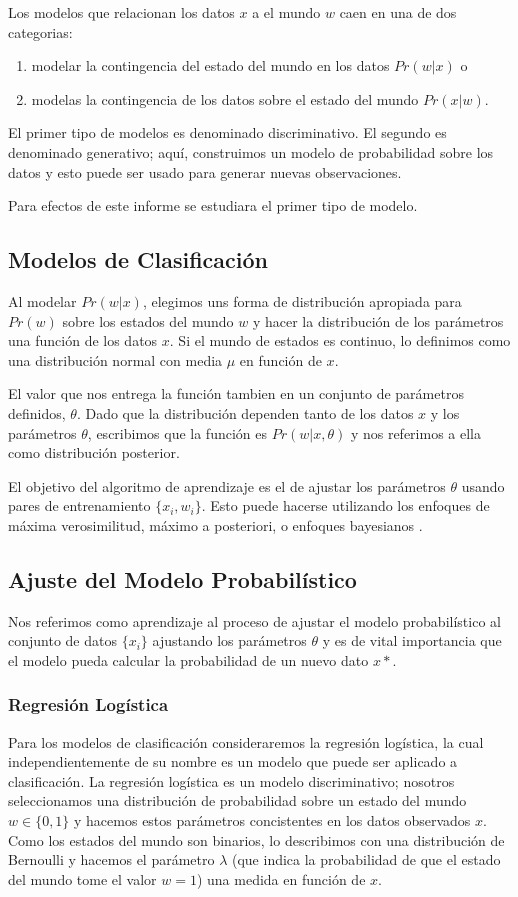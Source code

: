 \documentclass[letter,12pt]{report}
\begin{document}
Los modelos que relacionan los datos $x$ a el mundo $w$ caen en una de dos categorias:
\begin{enumerate}
    \item modelar la contingencia del estado del mundo en los datos $Pr(w|x)$ o
    \item modelas la contingencia de los datos sobre el estado del mundo $Pr(x|w)$.
\end{enumerate}

El primer tipo de modelos es denominado discriminativo. El segundo es denominado
generativo; aquí, construimos un modelo de probabilidad sobre los datos y esto puede ser
usado para generar nuevas observaciones.

Para efectos de este informe se estudiara el primer tipo de modelo.

\subsection{Modelos de Clasificación}
Al modelar $Pr(w|x)$, elegimos uns forma de distribución apropiada para $Pr(w)$ sobre los
estados del mundo $w$ y hacer la distribución de los parámetros una función de los datos
$x$. Si el mundo de estados es continuo, lo definimos como una distribución normal con
media $\mu$ en función de $x$\cite{MLClass}.

El valor que nos entrega la función tambien en un conjunto de parámetros definidos,
$\theta$. Dado que la distribución dependen tanto de los datos $x$ y los parámetros
$\theta$, escribimos que la función es $Pr(w|x, \theta)$ y nos referimos a ella como
distribución posterior.

El objetivo del algoritmo de aprendizaje es el de ajustar los parámetros $\theta$ usando
pares de entrenamiento $\{x_i, w_i\}$. Esto puede hacerse utilizando los enfoques de
máxima verosimilitud, máximo a posteriori, o enfoques bayesianos .%

\subsection{Ajuste del Modelo Probabilístico}
Nos referimos como aprendizaje al proceso de ajustar el modelo probabilístico al conjunto
de datos $\{x_i\}$ ajustando los parámetros $\theta$ y es de vital importancia que el
modelo pueda calcular la probabilidad de un nuevo dato $x*$\cite{Probab}.

\subsubsection{Regresión Logística}
Para los modelos de clasificación consideraremos la regresión logística\cite{LogicR}, la cual
independientemente de su nombre es un modelo que puede ser aplicado a clasificación. La
regresión logística es un modelo  discriminativo; nosotros seleccionamos una distribución
de probabilidad sobre un estado del mundo $w \in \{0, 1\}$ y hacemos estos parámetros
concistentes en los datos observados $x$. Como los estados del mundo son binarios,
lo describimos con una distribución de Bernoulli y hacemos el parámetro $\lambda$ (que
indica la probabilidad de que el estado del mundo tome el valor $w=1$) una medida en
función de $x$.
\end{document}
